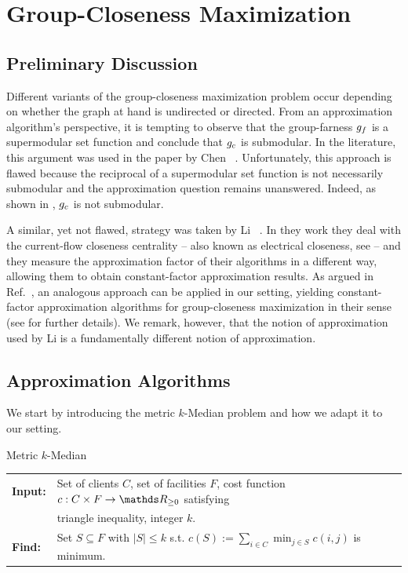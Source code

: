\section{Group-Closeness Maximization}
\subsection{Preliminary Discussion}
\label{sec:group-harm-clos-max:gc-prel-disc}
%
Different variants of the group-closeness maximization problem occur depending
on whether the graph at hand is undirected or directed.
From an approximation algorithm's perspective, it is tempting to observe that
the group-farness $g_f$ is a supermodular set function and conclude that
$g_c$ is submodular. In the literature, this argument was used in the paper
by Chen \etal~\cite{DBLP:conf/adc/ChenWW16}. Unfortunately, this approach is
flawed because the reciprocal of a supermodular set function is not necessarily
submodular and the approximation question remains unanswered. Indeed, as shown
in , $g_c$ is not submodular.

A similar, yet not flawed, strategy was taken by Li
\etal~\cite{DBLP:conf/www/0002PSYZ19}. In they work they deal with the
current-flow closeness centrality -- also known as electrical closeness, see
 -- and they measure the approximation factor
of their algorithms in a different way, allowing them to obtain
constant-factor approximation results.
As argued in Ref.~\cite[Appendix C]{DBLP:conf/alenex/AngrimanBDGGM21}, an
analogous approach can be applied in our setting, yielding constant-factor
approximation algorithms for group-closeness maximization in their sense
(see  for further details).
We remark, however, that the notion of approximation used by Li \etal is a
fundamentally different notion of approximation.

\subsection{Approximation Algorithms}
%
We start by introducing the metric $k$-Median problem and how we adapt it to our setting.

\begin{cproblem}{Metric $k$-Median}
\begin{tabular}{ll}
\textbf{Input:} & Set of clients $C$, set of facilities $F$, cost function $c : C \times F \to \real_{\ge 0}$
satisfying\\
                & triangle inequality, integer $k$.\\
\textbf{Find:} & Set $S \subseteq F$ with $|S| \le k$ s.t. $c(S) := \sum_{i \in C}\min_{j\in S}c(i, j)$
is minimum.
\end{tabular}
\end{cproblem}

